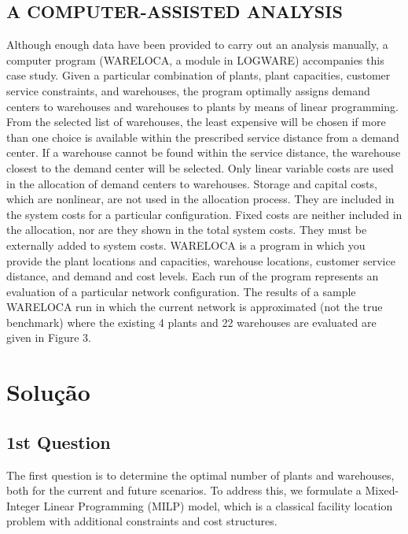 \documentclass[12pt,a4paper]{article}
\begin{document}
\subsection{A COMPUTER-ASSISTED ANALYSIS}

Although enough data have been provided to carry out an analysis manually, a computer program (WARELOCA, a module in LOGWARE) accompanies this case study.
Given a particular combination of plants, plant capacities, customer service constraints, and warehouses, the program optimally assigns demand centers to warehouses and warehouses to plants by means of linear programming.
From the selected list of warehouses, the least expensive will be chosen if more than one choice is available within the prescribed service distance from a demand center.
If a warehouse cannot be found within the service distance, the warehouse closest to the demand center will be selected.
Only linear variable costs are used in the allocation of demand centers to warehouses.
Storage and capital costs, which are nonlinear, are not used in the allocation process.
They are included in the system costs for a particular configuration.
Fixed costs are neither included in the allocation, nor are they shown in the total system costs.
They must be externally added to system costs.
WARELOCA is a program in which you provide the plant locations and capacities, warehouse locations, customer service distance, and demand and cost levels.
Each run of the program represents an evaluation of a particular network configuration.
The results of a sample WARELOCA run in which the current network is approximated (not the true benchmark) where the existing 4 plants and 22 warehouses are evaluated are given in \color{red}Figure 3\color{black}.


\section{Solução}

\subsection{1st Question}


The first question is to determine the optimal number of plants and warehouses, both for the current and future scenarios.
To address this, we formulate a Mixed-Integer Linear Programming (MILP) model, which is a classical facility location problem with additional constraints and cost structures.
\end{document}
